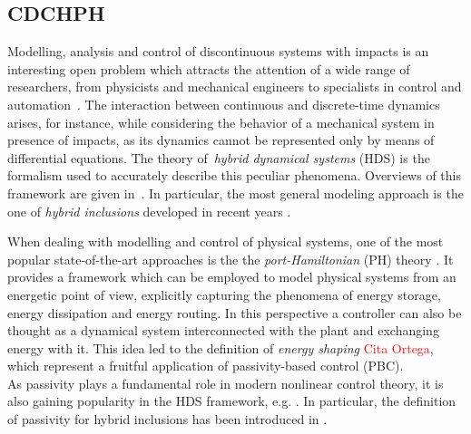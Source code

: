 %
{\color{green}
\subsection{CDCHPH}
Modelling, analysis and control of discontinuous systems with impacts is an interesting open problem which attracts the attention of a wide range of researchers, from physicists and mechanical engineers to specialists in control and automation~\cite{ModellingControlHDS}.
The interaction between continuous and discrete-time dynamics arises, for instance, while considering the behavior of a mechanical system in presence of impacts, as its dynamics cannot be represented only by means of differential equations. The theory of~\textit{hybrid dynamical systems} (HDS) is the formalism used to accurately describe this peculiar phenomena. Overviews of this framework are given in~\cite{van2000introduction,haddad2006impulsive}. In particular, the most general modeling approach is the one of \textit{hybrid inclusions} developed in recent years \cite{goebel2009hybrid}.

When dealing with modelling and control of physical systems, one of the most popular state-of-the-art approaches is the the \textit{port-Hamiltonian} (PH) theory \cite{secchi2007control,van2014port}. It provides a framework which can be employed to model physical systems from an energetic point of view, explicitly capturing the phenomena of energy storage, energy dissipation and energy routing. 
In this perspective a controller can also be thought as a dynamical system interconnected with the plant and exchanging energy with it. 
This idea led to the definition of \textit{energy shaping} \textcolor{red}{Cita Ortega}, which represent a fruitful application of passivity-based control (PBC).\\
As passivity plays a fundamental role in modern nonlinear control theory, it is also gaining popularity in the HDS framework, e.g. \cite{spong2007passivity,carrasco2010passivity}. In particular, the definition of passivity for hybrid inclusions has been introduced in \cite{naldi2011passivity,naldi2013passivity}.

}
